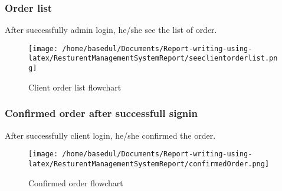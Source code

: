\documentclass[12pt,a4paper]{article}
\newcommand\tab[1][1cm]{\hspace*{#1}}
\begin{document}
	\subsubsection{Order list}
		\tab After successfully admin login, he/she see the list of order.
		\begin{figure}[H]
		\centering
		\texttt{[image: /home/basedul/Documents/Report-writing-using-latex/ResturentManagementSystemReport/seeclientorderlist.png]}
		\caption{Client order list flowchart}
		\label{fig:seeclientorderlist} 
		\end{figure}
		
	\subsubsection{Confirmed order after successfull signin}
		\tab After successfully client login, he/she confirmed the order.
		\begin{figure}[H]
		\centering
		\texttt{[image: /home/basedul/Documents/Report-writing-using-latex/ResturentManagementSystemReport/confirmedOrder.png]}
		\caption{Confirmed order flowchart}
		\label{fig:confirmedOrder} 
		\end{figure}
		

		
		
\end{document}
